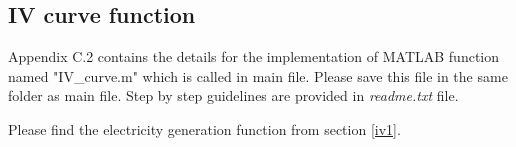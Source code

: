 
\subsection{IV curve function}
Appendix C.2 contains the details for the implementation of MATLAB function named "IV\_curve.m" which is called in main file. Please save this file in the same folder as main file. Step by step guidelines are provided in \textit{readme.txt} file.\par
Please find the electricity generation function from section \ref{iv1}.
